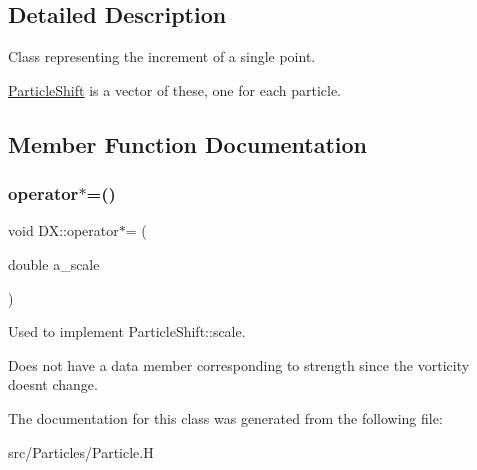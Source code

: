 \subsection{Detailed Description}
Class representing the increment of a single point. 

\hyperlink{class_particle_shift}{Particle\+Shift} is a vector of these, one for each particle. 

\subsection{Member Function Documentation}
\mbox{\label{class_d_x_a04524b576388b047b07c36a9d2e6bcb4}} 
\subsubsection{\texorpdfstring{operator$\ast$=()}{operator*=()}}
{\footnotesize\ttfamily void D\+X\+::operator$\ast$= (\begin{DoxyParamCaption}\item[{double}]{a\+\_\+scale }\end{DoxyParamCaption})\hspace{0.3cm}{\ttfamily [inline]}}



Used to implement Particle\+Shift\+::scale. 

Does not have a data member corresponding to strength since the vorticity doesn\textquotesingle{}t change. 

The documentation for this class was generated from the following file\+:\begin{DoxyCompactItemize}
\item 
src/\+Particles/Particle.\+H\end{DoxyCompactItemize}
